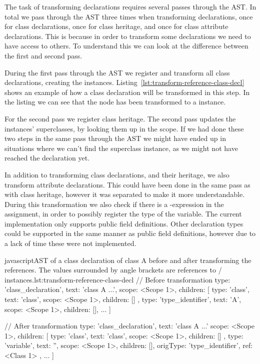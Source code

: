 The task of transforming declarations requires several passes through the AST\@.
In total we pass through the AST three times when transforming declarations, once for class declarations, once for class heritage, and once for class attribute declarations.
This is because in order to transform some declarations we need to have access to others.
To understand this we can look at the difference between the first and second pass.

During the first pass through the AST we register and transform all class declarations, creating the  instances.
Listing~\vref{lst:transform-reference-class-decl} shows an example of how a class declaration will be transformed in this step.
In the listing we can see that the  node has been transformed to a  instance.

For the second pass we register class heritage.
The second pass updates the  instances' superclasses, by looking them up in the scope.
If we had done these two steps in the same pass through the AST we might have ended up in situations where we can't find the superclass instance, as we might not have reached the declaration yet.

In addition to transforming class declarations, and their heritage, we also transform attribute declarations.
This could have been done in the same pass as with class heritage, however it was separated to make it more understandable.
During this transformation we also check if there is a -expression in the assignment, in order to possibly register the type of the variable.
The current implementation only supports public field definitions.
Other declaration types could be supported in the same manner as public field definitions, however due to a lack of time these were not implemented.

\begin{code}{javascript}{AST of a class declaration of class A before and after transforming the references. The values surrounded by angle brackets are references to / instances.}{lst:transform-reference-class-decl}
    // Before transformation
    {
        type: 'class_declaration',
        text: 'class A ...',
        scope: <Scope 1>,
        children: [
            {
                type: 'class',
                text: 'class',
                scope: <Scope 1>,
                children: []
            }, {
                type: 'type_identifier',
                text: 'A',
                scope: <Scope 1>,
                children: [],
            }
            ...
        ]
    }

    // After transformation
    {
        type: 'class_declaration',
        text: 'class A ...'
        scope: <Scope 1>,
        children: [
            {
                type: 'class',
                text: 'class',
                scope: <Scope 1>,
                children: []
            }, {
                type: 'variable',
                text: '',
                scope: <Scope 1>,
                children: [],
                origType: 'type_identifier',
                ref: <Class 1>
            },
            ...
        ]
    }
\end{code}

